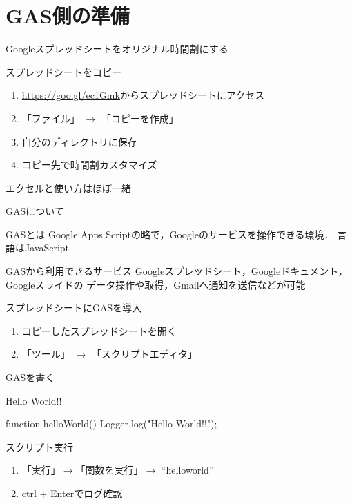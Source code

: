 \documentclass[dvipdfmx,xcolor={svgnames},aspectratio=169]{beamer}
\begin{document}
  \section{GAS側の準備}
  \begin{frame}{Googleスプレッドシートをオリジナル時間割にする}
    \begin{block}{スプレッドシートをコピー}
      \begin{enumerate}\setlength{\itemsep}{15pt}
        \item \url{https://goo.gl/ec1Gmk}からスプレッドシートにアクセス
        \item 「ファイル」 $\rightarrow$ 「コピーを作成」
        \item 自分のディレクトリに保存
        \item コピー先で時間割カスタマイズ
      \end{enumerate}
    \end{block}
    {\huge エクセルと使い方はほぼ一緒}
    \end{frame}
  \begin{frame}{GASについて}
    \begin{block}{GASとは}
      Google Apps Scriptの略で，Googleのサービスを操作できる環境．
      言語はJavaScript
    \end{block}
    \begin{block}{GASから利用できるサービス}
      Googleスプレッドシート，Googleドキュメント，Googleスライドの
      データ操作や取得，Gmailへ通知を送信などが可能
    \end{block}
  \end{frame}
  \begin{frame}{スプレッドシートにGASを導入}
    \begin{enumerate}  \setlength{\itemsep}{20pt}\LARGE
      \item コピーしたスプレッドシートを開く
      \item 「ツール」 $\rightarrow$ 「スクリプトエディタ」
    \end{enumerate}
  \end{frame}

  \begin{frame}[fragile]{GASを書く}
    \begin{exampleblock}{Hello World!!}
      \begin{GAS}
function helloWorld(){
  Logger.log("Hello World!!");
}
      \end{GAS}
    \end{exampleblock}
    \begin{block}{スクリプト実行}
      \begin{enumerate}
        \item 「実行」$\rightarrow$「関数を実行」$\rightarrow$ ``helloworld''
        \item ctrl + Enterでログ確認
      \end{enumerate}
    \end{block}
  \end{frame}
\end{document}
